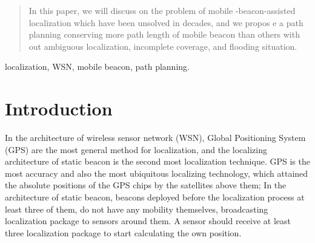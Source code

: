 \documentclass[conference]{IEEEtran}
\begin{document}




\maketitle


\begin{abstract}
In this paper, we will discuss on the problem of mobile
-beacon-assisted
localization which have been unsolved in decades, and we propos
e a path planning
conserving more path length of mobile beacon than others with
out ambiguous
localization, incomplete coverage, and flooding situation. 
\end{abstract}

\begin{IEEEkeywords}
localization, WSN, mobile beacon, path planning.
\end{IEEEkeywords}






%
\IEEEpeerreviewmaketitle


\section{Introduction}
In the architecture of wireless sensor network (WSN), Global Positioning System (GPS) are the most general method for localization, and the localizing architecture of static beacon is the second most localization technique. GPS is the most accuracy and also the most ubiquitous localizing technology, which attained the absolute positions of the GPS chips by the satellites above them; In the architecture of static beacon, beacons deployed before the localization process at least three of them, do not have any mobility themselves, broadcasting localization package to sensors around them. A sensor should receive at least three localization package to start calculating the own position. 
\end{document}
